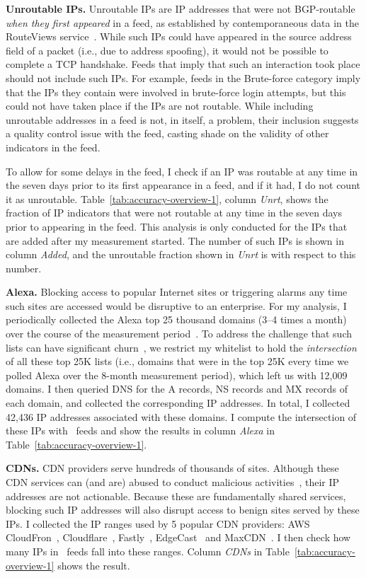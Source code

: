 \noindent\textbf{Unroutable IPs.} Unroutable IPs are IP addresses that
were not BGP-routable \emph{when they first appeared} in a feed, as
established by contemporaneous data in the RouteViews
service~\cite{Routeview}. While such IPs could have appeared in the
source address field of a packet (i.e., due to address spoofing), it
would not be possible to complete a TCP handshake. Feeds that imply
that such an interaction took place should not include such IPs. For
example, feeds in the Brute-force category imply that the IPs they
contain were involved in brute-force login attempts, but this could
not have taken place if the IPs are not routable. While including
unroutable addresses in a feed is not, in itself, a problem, their
inclusion suggests a quality control issue with the feed, casting
shade on the validity of other indicators in the feed.

To allow for some delays in the feed, I check if an IP was routable
at any time in the seven days prior to its first appearance in a feed,
and if it had, I do not count it as
unroutable. Table~\ref{tab:accuracy-overview-1}, column \textit{Unrt},
shows the fraction of IP indicators that were not routable at any time
in the seven days prior to appearing in the feed. This analysis is
only conducted for the IPs that are added after my measurement
started. The number of such IPs is shown in column \textit{Added}, and
the unroutable fraction shown in \textit{Unrt} is with respect to this
number.

\noindent\textbf{Alexa.} Blocking access to popular Internet sites or
triggering alarms any time such sites are accessed would be disruptive
to an enterprise. For my analysis, I periodically collected the
Alexa top 25 thousand domains (3--4 times a month) over the course of
the measurement period~\cite{alexa}. To address the challenge that
such lists can have significant churn~\cite{scheitle2018long}, we
restrict my whitelist to hold the \emph{intersection} of all these
top 25K lists (i.e., domains that were in the top 25K every time we
polled Alexa over the 8-month measurement period), which left us with
12,009 domains. I then queried DNS for the A records, NS
records and MX records of each domain, and collected the corresponding
IP addresses. In total, I collected 42,436 IP addresses associated
with these domains. I compute the intersection of these IPs
with \ti\ feeds and show the results in column \textit{Alexa} in
Table~\ref{tab:accuracy-overview-1}.


\noindent\textbf{CDNs.} CDN providers serve hundreds of thousands of
sites. Although these CDN services can (and are) abused to conduct
malicious activities~\cite{cdnabuse}, their IP addresses are not
actionable.  Because these are fundamentally shared services,
blocking such IP addresses will also disrupt access to benign
sites served by these IPs.  I collected the IP ranges used by 5
popular CDN providers: AWS CloudFron~\cite{cloudfront},
Cloudflare~\cite{cloudflare}, Fastly~\cite{fastly},
EdgeCast~\cite{edgecast} and MaxCDN~\cite{maxcdn}. I then check how
many IPs in \ti\ feeds fall into these ranges. Column \textit{CDNs} in
Table~\ref{tab:accuracy-overview-1} shows the result.

